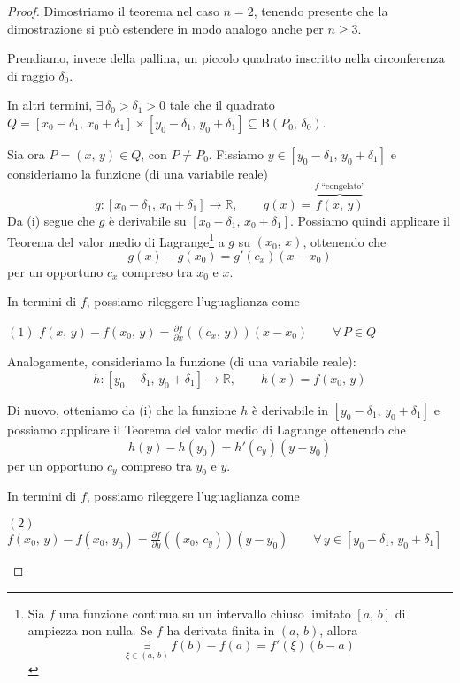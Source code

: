 \begin{proof}
Dimostriamo il teorema nel caso $n=2$, tenendo presente che la dimostrazione si può estendere in modo analogo anche per $n \geq 3$.

Prendiamo, invece della pallina, un piccolo quadrato inscritto nella circonferenza di raggio $\delta_0$.
\begin{center}
\def\svgwidth{14cm}

\end{center}
In altri termini, $\exists \, \delta_0 > \delta_1 > 0$ tale che il quadrato $Q=[x_0-\delta_1,\,x_0+\delta_1] \times [y_0-\delta_1,\,y_0+\delta_1] \subseteq \mathrm{B}(P_0,\,\delta_0)$.

Sia ora $P=(x,\,y) \in Q$, con $P \neq P_0$. Fissiamo $y \in [y_0-\delta_1,\,y_0+\delta_1]$ e consideriamo la funzione (di una variabile reale)
$$g:[x_0-\delta_1,\,x_0+\delta_1] \rightarrow \mathbb{R}, \qquad g(x) = \overbrace{f(x,\,y)}^{f \text{ ``congelato''}}$$
Da (i) segue che $g$ è derivabile su $[x_0-\delta_1,\,x_0+\delta_1]$. Possiamo quindi applicare il Teorema del valor medio di Lagrange\footnote{
\cite{Greco2012} Sia $f$ una funzione continua su un intervallo chiuso limitato $[a,\,b]$ di ampiezza non nulla. Se $f$ ha derivata finita in $(a,\,b)$, allora
$$
\underset{{\xi \in (a,\,b)}}{\exists} \, f(b)-f(a) = f'(\xi)(b-a)
$$
} a $g$ su $(x_0,\,x)$, ottenendo che
$$g(x)-g(x_0) = g'(c_x)(x-x_0)$$
per un opportuno $c_x$ compreso tra $x_0$ e $x$.

In termini di $f$, possiamo rileggere l'uguaglianza come
	\begin{center}
	$\mathrm{(1)}$
	\hfill
	$\displaystyle f(x,\,y) - f(x_0,\,y) = \frac{\partial f}{\partial x}((c_x,\,y))(x-x_0) \qquad \forall \, P \in Q$\hfill\null
	\end{center}

Analogamente, consideriamo la funzione (di una variabile reale):
$$h:[y_0-\delta_1,\,y_0+\delta_1] \rightarrow \mathbb{R}, \qquad h(x) = f(x_0,\,y)$$

Di nuovo, otteniamo da (i) che la funzione $h$ è derivabile in $[y_0-\delta_1,\,y_0+\delta_1]$ e possiamo applicare il Teorema del valor medio di Lagrange ottenendo che
$$h(y)-h(y_0) = h'(c_y)(y-y_0)$$
per un opportuno $c_y$ compreso tra $y_0$ e $y$.

In termini di $f$, possiamo rileggere l'uguaglianza come
	\begin{center}
	$\mathrm{(2)}$
	\hfill
	$\displaystyle f(x_0,\,y) - f(x_0,\,y_0) = \frac{\partial f}{\partial y}((x_0,\,c_y))(y-y_0) \qquad \forall \, y \in [y_0-\delta_1,\,y_0+\delta_1]$\hfill\null
	\end{center}


\end{proof}
